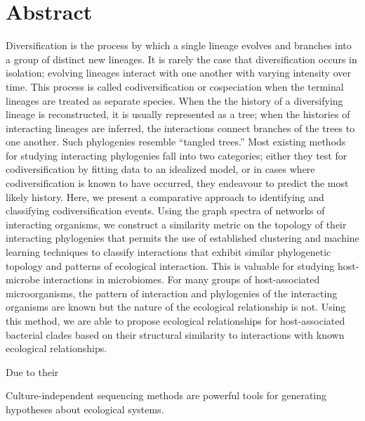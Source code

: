 \section{Abstract}

Diversification is the process by which a single lineage evolves and branches into a group of distinct new lineages. It is rarely the case that diversification occurs in isolation; evolving lineages interact with one another with varying intensity over time. This process is called codiversification or cospeciation when the terminal lineages are treated as separate species. When the the history of a diversifying lineage is reconstructed, it is usually represented as a tree; when the histories of interacting lineages are inferred, the interactions connect branches of the trees to one another. Such phylogenies resemble ``tangled trees.'' Most existing methods for studying interacting phylogenies fall into two categories; either they test for codiversification by fitting data to an idealized model, or in cases where codiversification is known to have occurred, they endeavour to predict the most likely history. Here, we present a comparative approach to identifying and classifying codiversification events. Using the graph spectra of networks of interacting organisms, we construct a similarity metric on the topology of their interacting phylogenies that permits the use of established clustering and machine learning techniques to classify interactions that exhibit similar phylogenetic topology and patterns of ecological interaction. This is valuable for studying host-microbe interactions in microbiomes. For many groups of host-associated microorganisms, the pattern of interaction and phylogenies of the interacting organisms are known but the nature of the ecological relationship is not. Using this method, we are able to propose ecological relationships for host-associated bacterial clades based on their structural similarity to interactions with known ecological relationships.

Due to their 

Culture-independent sequencing methods are powerful tools for generating hypotheses about ecological systems.